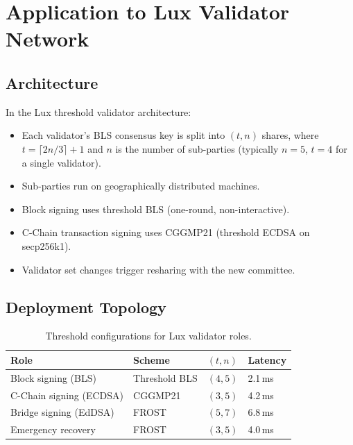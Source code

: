 \section{Application to Lux Validator Network}

\label{sec:application}

\subsection{Architecture}

In the Lux threshold validator architecture:

\begin{itemize}[leftmargin=2em]
  \item Each validator's BLS consensus key is split into $(t, n)$ shares, where
        $t = \lceil 2n/3 \rceil + 1$ and $n$ is the number of sub-parties
        (typically $n = 5$, $t = 4$ for a single validator).
  \item Sub-parties run on geographically distributed machines.
  \item Block signing uses threshold BLS (one-round, non-interactive).
  \item C-Chain transaction signing uses CGGMP21 (threshold ECDSA on secp256k1).
  \item Validator set changes trigger resharing with the new committee.
\end{itemize}

\subsection{Deployment Topology}

\begin{table}[ht]
\centering
\caption{Threshold configurations for Lux validator roles.}
\label{tab:configurations}
\begin{tabular}{llll}
\toprule
\textbf{Role} & \textbf{Scheme} & \textbf{$(t, n)$} & \textbf{Latency} \\
\midrule
Block signing (BLS) & Threshold BLS & $(4, 5)$ & 2.1\,ms \\
C-Chain signing (ECDSA) & CGGMP21 & $(3, 5)$ & 4.2\,ms \\
Bridge signing (EdDSA) & FROST & $(5, 7)$ & 6.8\,ms \\
Emergency recovery & FROST & $(3, 5)$ & 4.0\,ms \\
\bottomrule
\end{tabular}
\end{table}

